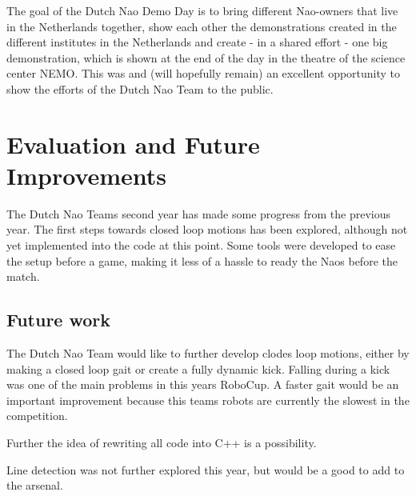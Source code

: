 \documentclass[11pt,a4paper,oneside]{article}
\begin{document}
The goal of the Dutch Nao Demo Day is to bring different Nao-owners that live in the Netherlands together, show each other the demonstrations created in the different institutes in the Netherlands and create - in a shared effort - one big demonstration, which is shown at the end of the day in the theatre of the science center NEMO. This was and (will hopefully remain) an excellent opportunity to show the efforts of the Dutch Nao Team to the public. 

\section{Evaluation and Future Improvements}

The Dutch Nao Teams second year has made some progress from the previous year. The first steps towards closed loop motions has been explored, although not yet implemented into the code at this point. Some tools were developed to ease the setup before a game, making it less of a hassle to ready the Naos before the match.

\subsection{Future work}
The Dutch Nao Team would like to further develop clodes loop motions, either by making a closed loop gait or create a fully dynamic kick. Falling during a kick was one of the main problems in this years RoboCup. A faster gait would be an important improvement because this teams robots are currently the slowest in the competition.

Further the idea of rewriting all code into C++ is a possibility.

Line detection was not further explored this year, but would be a good to add to the arsenal.
\end{document}
